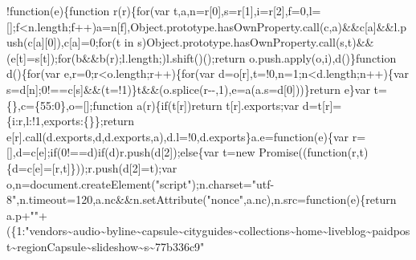 !function(e)\{function r(r)\{for(var
t,a,n=r{[}0{]},s=r{[}1{]},i=r{[}2{]},f=0,l={[}{]};f\textless{}n.length;f++)a=n{[}f{]},Object.prototype.hasOwnProperty.call(c,a)\&\&c{[}a{]}\&\&l.push(c{[}a{]}{[}0{]}),c{[}a{]}=0;for(t
in
s)Object.prototype.hasOwnProperty.call(s,t)\&\&(e{[}t{]}=s{[}t{]});for(b\&\&b(r);l.length;)l.shift()();return
o.push.apply(o,i\textbar{}\textbar{}{[}{]}),d()\}function d()\{for(var
e,r=0;r\textless{}o.length;r++)\{for(var
d=o{[}r{]},t=!0,n=1;n\textless{}d.length;n++)\{var
s=d{[}n{]};0!==c{[}s{]}\&\&(t=!1)\}t\&\&(o.splice(r-\/-,1),e=a(a.s=d{[}0{]}))\}return
e\}var t=\{\},c=\{55:0\},o={[}{]};function a(r)\{if(t{[}r{]})return
t{[}r{]}.exports;var d=t{[}r{]}=\{i:r,l:!1,exports:\{\}\};return
e{[}r{]}.call(d.exports,d,d.exports,a),d.l=!0,d.exports\}a.e=function(e)\{var
r={[}{]},d=c{[}e{]};if(0!==d)if(d)r.push(d{[}2{]});else\{var t=new
Promise((function(r,t)\{d=c{[}e{]}={[}r,t{]}\}));r.push(d{[}2{]}=t);var
o,n=document.createElement("script");n.charset="utf-8",n.timeout=120,a.nc\&\&n.setAttribute("nonce",a.nc),n.src=function(e)\{return
a.p+""+(\{1:"vendors\textasciitilde{}audio\textasciitilde{}byline\textasciitilde{}capsule\textasciitilde{}cityguides\textasciitilde{}collections\textasciitilde{}home\textasciitilde{}liveblog\textasciitilde{}paidpost\textasciitilde{}regionCapsule\textasciitilde{}slideshow\textasciitilde{}s\textasciitilde{}77b336c9"
